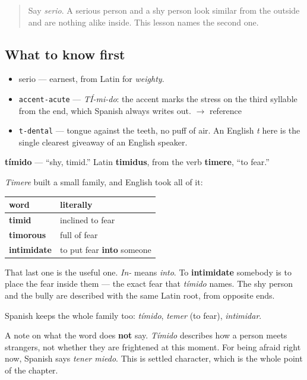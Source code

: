 \begin{quote}
Say \emph{serio}. A serious person and a shy person look similar from the outside and are nothing alike inside. This lesson names the second one.
\end{quote}

\subsection*{What to know first}
\begin{itemize}
\raggedright
  \item serio — earnest, from Latin for \emph{weighty}.
\end{itemize}

\begin{sounds}
\begin{itemize}
\raggedright
  \item \texttt{accent-acute} — \emph{TÍ-mi-do}: the accent marks the stress on the third syllable from the end, which Spanish always writes out. $\to$ reference
  \item \texttt{t-dental} — tongue against the teeth, no puff of air. An English \emph{t} here is the single clearest giveaway of an English speaker.
\end{itemize}
\end{sounds}

\begin{cousinweb}
\textbf{tímido} — \textquotedblleft{}shy, timid.\textquotedblright{} Latin \textbf{timidus}, from the verb \textbf{timere}, \textquotedblleft{}to fear.\textquotedblright{}

\emph{Timere} built a small family, and English took all of it:

\noindent
\begin{tabularx}{\linewidth}{@{}>{\raggedright\arraybackslash}X>{\raggedright\arraybackslash}X@{}}
\toprule
\textbf{word} & \textbf{literally} \\
\midrule
\textbf{timid} & inclined to fear \\
\textbf{timorous} & full of fear \\
\textbf{intimidate} & to put fear \textbf{into} someone \\
\bottomrule
\end{tabularx}

That last one is the useful one. \emph{In-} means \emph{into}. To \textbf{intimidate} somebody is to place the fear inside them — the exact fear that \emph{tímido} names. The shy person and the bully are described with the same Latin root, from opposite ends.

Spanish keeps the whole family too: \emph{tímido}, \emph{temer} (to fear), \emph{intimidar}.

A note on what the word does \textbf{not} say. \emph{Tímido} describes how a person meets strangers, not whether they are frightened at this moment. For being afraid right now, Spanish says \emph{tener miedo}. This is settled character, which is the whole point of the chapter.
\end{cousinweb}

